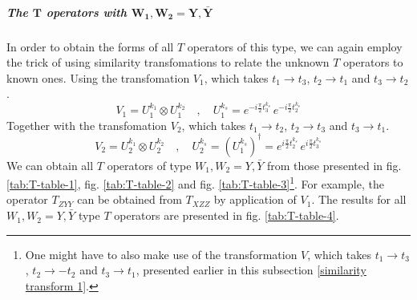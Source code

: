 \subparagraph[The $T$ operators with $W_1,W_2 = Y, \bar{Y}$]{The $\mathbf{T}$ operators with $\mathbf{W_1,W_2 = Y, \bar{Y}}$}
In order to obtain the forms of all $T$ operators of this type, we can again employ the trick of using similarity transfomations to relate the unknown $T$ operators to known ones. Using the transfomation $V_1$, which takes $t_1 \to t_3$, $t_2 \to t_1$ and $t_3 \to t_2$.
%
%
\begin{equation}
V_1 = U_1^{k_1} \otimes U_1^{k_2}
%
\quad , \quad
%
U_1^{k_s} = e^{-i \frac{\pi}{2} t_3^{k_s}} \, e^{-i \frac{\pi}{2} t_2^{k_s}}
\end{equation}
%
%
Together with the transfomation $V_2$, which takes $t_1 \to t_2$, $t_2 \to t_3$ and $t_3 \to t_1$.
%
%
\begin{equation}
V_2 = U_2^{k_1} \otimes U_2^{k_2}
%
\quad , \quad
%
U_2^{k_s} = \left( U_1^{k_s} \right)^\dagger = e^{i \frac{\pi}{2} t_2^{k_s}} \, e^{i \frac{\pi}{2} t_3^{k_s}}
\end{equation}
%
%
We can obtain all $T$ operators of type $W_1,W_2 = Y, \bar{Y}$ from those presented in fig. \ref{tab:T-table-1}, fig. \ref{tab:T-table-2} and fig. \ref{tab:T-table-3}\footnote{One might have to also make use of the transformation $V$, which takes $t_1 \to t_3$, $t_2 \to -t_2$ and $t_3 \to t_1$, presented earlier in this subsection \ref{similarity transform 1}.}. For example, the operator $T_{ZYY}$ can be obtained from $T_{XZZ}$ by application of $V_1$. The results for all $W_1,W_2 = Y, \bar{Y}$ type $T$ operators are presented in fig. \ref{tab:T-table-4}.
%
%
